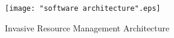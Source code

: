 \documentclass[a4paper, 12pt]{article}
\begin{document}
\begin{figure}[!htbp]
\centering
\texttt{[image: "software architecture".eps]}
\caption{Invasive Resource Management Architecture}
\label{fig:7}
\end{figure}
\clearpage
\end{document}
